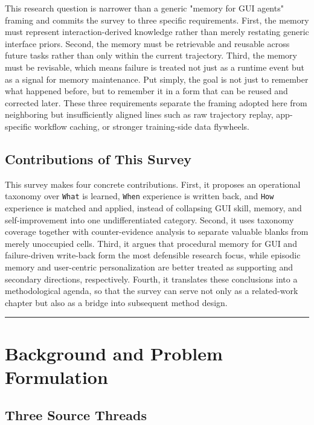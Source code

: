 \documentclass{article}
\begin{document}
This research question is narrower than a generic "memory for GUI
agents" framing and commits the survey to three specific requirements.
First, the memory must represent interaction-derived knowledge rather
than merely restating generic interface priors. Second, the memory must
be retrievable and reusable across future tasks rather than only within
the current trajectory. Third, the memory must be revisable, which means
failure is treated not just as a runtime event but as a signal for
memory maintenance. Put simply, the goal is not just to remember what
happened before, but to remember it in a form that can be reused and
corrected later. These three requirements separate the framing adopted
here from neighboring but insufficiently aligned lines such as raw
trajectory replay, app-specific workflow caching, or stronger
training-side data flywheels.

\subsection{Contributions of This
Survey}\label{24-contributions-of-this-survey}

This survey makes four concrete contributions. First, it proposes an
operational taxonomy over \texttt{What} is learned, \texttt{When}
experience is written back, and \texttt{How} experience is matched and
applied, instead of collapsing GUI skill, memory, and self-improvement
into one undifferentiated category. Second, it uses taxonomy coverage
together with counter-evidence analysis to separate valuable blanks from
merely unoccupied cells. Third, it argues that procedural memory for GUI
and failure-driven write-back form the most defensible research focus,
while episodic memory and user-centric personalization are better
treated as supporting and secondary directions, respectively. Fourth, it
translates these conclusions into a methodological agenda, so that the
survey can serve not only as a related-work chapter but also as a bridge
into subsequent method design.

\begin{center}\rule{0.5\linewidth}{0.5pt}\end{center}

\section{Background and Problem
Formulation}\label{3-background-and-problem-formulation}

\subsection{Three Source Threads}\label{31-three-source-threads}
\end{document}
